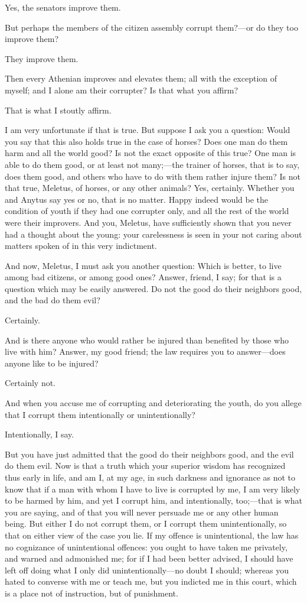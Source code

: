 \documentclass[12pt]{article}
\begin{document}
Yes, the senators improve them.

But perhaps the members of the citizen assembly corrupt them?---or
do they too improve them?

They improve them.

Then every Athenian improves and elevates them; all with the exception
of myself; and I alone am their corrupter? Is that what you affirm?

That is what I stoutly affirm.

I am very unfortunate if that is true. But suppose I ask you a question:
Would you say that this also holds true in the case of horses? Does
one man do them harm and all the world good? Is not the exact opposite
of this true? One man is able to do them good, or at least not many;---the
trainer of horses, that is to say, does them good, and others who have to do
with them rather injure them? Is not that true, Meletus,
of horses, or any other animals? Yes, certainly. Whether you and Anytus
say yes or no, that is no matter. Happy indeed would be the condition
of youth if they had one corrupter only, and all the rest of the world
were their improvers. And you, Meletus, have sufficiently shown that
you never had a thought about the young: your carelessness is seen
in your not caring about matters spoken of in this very indictment.

And now, Meletus, I must ask you another question: Which is better,
to live among bad citizens, or among good ones? Answer, friend, I
say; for that is a question which may be easily answered. Do not the
good do their neighbors good, and the bad do them evil?

Certainly.

And is there anyone who would rather be injured than benefited by
those who live with him? Answer, my good friend; the law requires
you to answer---does anyone like to be injured?

Certainly not.

And when you accuse me of corrupting and deteriorating the youth,
do you allege that I corrupt them intentionally or unintentionally?

Intentionally, I say.

But you have just admitted that the good do their neighbors good,
and the evil do them evil. Now is that a truth which your superior
wisdom has recognized thus early in life, and am I, at my age, in
such darkness and ignorance as not to know that if a man with whom
I have to live is corrupted by me, I am very likely to be harmed by
him, and yet I corrupt him, and intentionally, too;---that is what
you are saying, and of that you will never persuade me or any other
human being. But either I do not corrupt them, or I corrupt them unintentionally,
so that on either view of the case you lie. If my offence is unintentional,
the law has no cognizance of unintentional offences: you ought to
have taken me privately, and warned and admonished me; for if I had
been better advised, I should have left off doing what I only did
unintentionally---no doubt I should; whereas you hated to converse
with me or teach me, but you indicted me in this court, which is a
place not of instruction, but of punishment.
\end{document}
